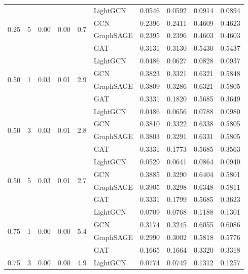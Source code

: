 {\begin{longtable}{cccccl rrrr}
\midrule
\multirow{4}{*}{0.25} & \multirow{4}{*}{5} & \multirow{4}{*}{0.00} & \multirow{4}{*}{0.00} & \multirow{4}{*}{0.7} & LightGCN & 0.0546 & 0.0592 & 0.0914 & 0.0894 \\
 & & & & & GCN & 0.2396 & 0.2411 & 0.4609 & 0.4623 \\
 & & & & & GraphSAGE & 0.2395 & 0.2396 & 0.4603 & 0.4603 \\
 & & & & & GAT & 0.3131 & 0.3130 & 0.5430 & 0.5437 \\
\midrule
\multirow{4}{*}{0.50} & \multirow{4}{*}{1} & \multirow{4}{*}{0.03} & \multirow{4}{*}{0.01} & \multirow{4}{*}{2.9} & LightGCN & 0.0486 & 0.0627 & 0.0828 & 0.0937 \\
 & & & & & GCN & 0.3823 & 0.3321 & 0.6321 & 0.5848 \\
 & & & & & GraphSAGE & 0.3809 & 0.3286 & 0.6321 & 0.5805 \\
 & & & & & GAT & 0.3331 & 0.1820 & 0.5685 & 0.3649 \\
\midrule
\multirow{4}{*}{0.50} & \multirow{4}{*}{3} & \multirow{4}{*}{0.03} & \multirow{4}{*}{0.01} & \multirow{4}{*}{2.8} & LightGCN & 0.0486 & 0.0656 & 0.0788 & 0.0980 \\
 & & & & & GCN & 0.3810 & 0.3322 & 0.6338 & 0.5805 \\
 & & & & & GraphSAGE & 0.3803 & 0.3291 & 0.6331 & 0.5805 \\
 & & & & & GAT & 0.3331 & 0.1773 & 0.5685 & 0.3563 \\
\midrule
\multirow{4}{*}{0.50} & \multirow{4}{*}{5} & \multirow{4}{*}{0.03} & \multirow{4}{*}{0.01} & \multirow{4}{*}{2.7} & LightGCN & 0.0529 & 0.0641 & 0.0864 & 0.0940 \\
 & & & & & GCN & 0.3885 & 0.3290 & 0.6404 & 0.5801 \\
 & & & & & GraphSAGE & 0.3905 & 0.3298 & 0.6348 & 0.5811 \\
 & & & & & GAT & 0.3331 & 0.1799 & 0.5685 & 0.3623 \\
\midrule
\multirow{4}{*}{0.75} & \multirow{4}{*}{1} & \multirow{4}{*}{0.00} & \multirow{4}{*}{0.00} & \multirow{4}{*}{5.4} & LightGCN & 0.0709 & 0.0768 & 0.1188 & 0.1301 \\
 & & & & & GCN & 0.3174 & 0.3245 & 0.6055 & 0.6086 \\
 & & & & & GraphSAGE & 0.2990 & 0.3002 & 0.5818 & 0.5776 \\
 & & & & & GAT & 0.1665 & 0.1664 & 0.3320 & 0.3318 \\
\midrule
\multirow{4}{*}{0.75} & \multirow{4}{*}{3} & \multirow{4}{*}{0.00} & \multirow{4}{*}{0.00} & \multirow{4}{*}{4.9} & LightGCN & 0.0774 & 0.0749 & 0.1312 & 0.1257 \\

\end{longtable}}
